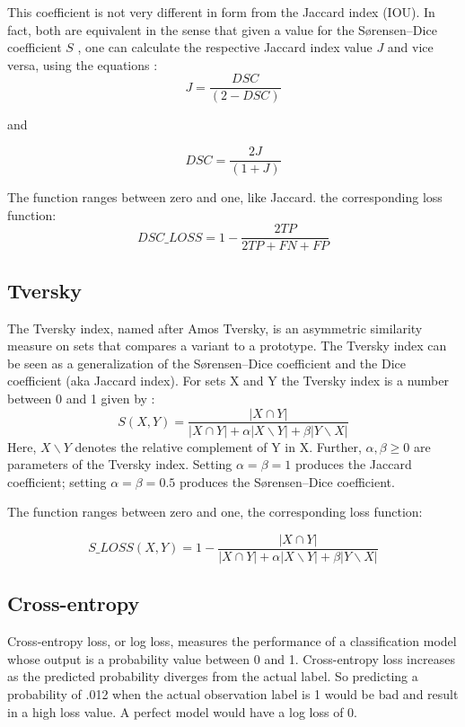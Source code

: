 This coefficient is not very different in form from the Jaccard index (IOU). In fact, both are equivalent in the sense that given a value for the Sørensen–Dice coefficient $S$ , one can calculate the respective Jaccard index value $J$  and vice versa, using the equations : 
\begin{equation}
    J = \frac{DSC}{( 2 − DSC )}
\end{equation}

and 

\begin{equation}
    DSC = \frac{2 J  }{( 1 + J )}
\end{equation}

The function ranges between zero and one, like Jaccard. the corresponding loss function:
\begin{equation}
    DSC\_LOSS = 1 - \frac{2 TP}{2 TP + FN + FP}
\end{equation}

\subsection{Tversky}

The Tversky index, named after Amos Tversky, is an asymmetric similarity measure on sets that compares a variant to a prototype. The Tversky index can be seen as a generalization of the Sørensen–Dice coefficient and the Dice coefficient (aka Jaccard index).
For sets X and Y the Tversky index is a number between 0 and 1 given by :
\begin{equation}
    S(X, Y) = \frac{| X \cap Y |}{| X \cap Y | + \alpha|X  ∖ Y| + \beta | Y  ∖  X|}
\end{equation}
Here, $X ∖ Y$ denotes the relative complement of Y in X. 
Further, $\alpha , \beta \geq 0$  are parameters of the Tversky index. Setting $\alpha = \beta = 1$ produces the Jaccard coefficient; setting $\alpha = \beta = 0.5$  produces the Sørensen–Dice coefficient. 

The function ranges between zero and one, the corresponding loss function:

\begin{equation}
    S\_LOSS(X, Y) =  1 - \frac{| X \cap Y |}{| X \cap Y | + \alpha|X  ∖ Y| + \beta | Y  ∖  X|}
\end{equation}

\subsection{Cross-entropy}
Cross-entropy loss, or log loss, measures the performance of a classification model whose output is a probability value between 0 and 1. Cross-entropy loss increases as the predicted probability diverges from the actual label. So predicting a probability of .012 when the actual observation label is 1 would be bad and result in a high loss value. A perfect model would have a log loss of 0.

